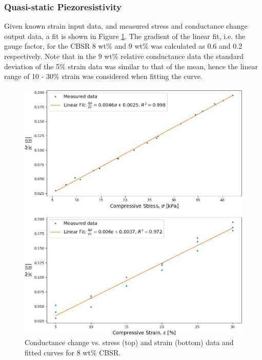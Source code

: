\subsubsection{Quasi-static Piezoresistivity}\label{sec:Quasi-static Piezoresistivity2}
Given known strain input data, and measured stress and conductance change output data, a fit is shown in Figure \ref{fig:quasi_r_8p}. The gradient of the linear fit, i.e. the gauge factor, for the CBSR 8 wt\% and 9 wt\% was calculated as 0.6 and 0.2 respectively. Note that in the 9 wt\% relative conductance data the standard deviation of the 5\% strain data was similar to that of the mean, hence the linear range of 10 - 30\% strain was considered when fitting the curve.
\begin{figure}[H]
    \centering
    \includegraphics[width=0.8\linewidth]{Figures/CBSR_8p_cond_stress_strain_sin_titulo.jpg}
    \caption{Conductance change vs. stress (top) and strain (bottom) data and fitted curves for 8 wt\% CBSR.}
    \label{fig:quasi_r_8p}
\end{figure}


